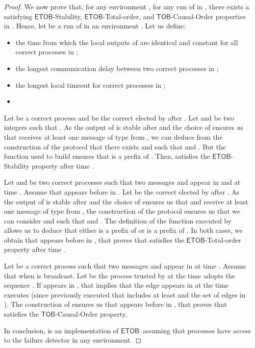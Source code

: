 \documentclass[11pt]{article}
\newcommand{\ETOB}{\ensuremath{\mathsf{ETOB}}}
\newcommand{\TOB}{\ensuremath{\mathsf{TOB}}}
\begin{document}
{\begin{proof}
We now prove that, for any environment , for any run  of  in , there exists a  satisfying \ETOB-Stability, \ETOB-Total-order, and \TOB-Causal-Order properties in . Hence, let  be a run of  in an environment . Let us define:
\begin{itemize}
\item  the time from which the local outputs of  are identical and constant for all correct processes in ;
\item  the longest communication delay between two correct processes in ;
\item  the longest local timeout for correct processes in ;
\item 
\end{itemize}

Let  be a correct process and  be the correct elected by  after . Let  and  be two integers such that . As the output of  is stable after  and the choice of  ensures us that  receives at least one message of type  from , we can deduce from the construction of the protocol that there exists  and  such that  and . But the function  used to build  ensures that  is a prefix of . Then,  satisfies the \ETOB-Stability property after time .

Let  and  be two correct processes such that two messages  and  appear in  and  at time . Assume that  appears before  in . Let  be the correct elected by  after . As the output of  is stable after  and the choice of  ensures us that  and  receive at least one message of type  from , the construction of the protocol ensures us that we can consider  and  such that  and . The definition of the function  executed by  allows us to deduce that either  is a prefix of  or  is a prefix of . In both cases, we obtain that  appears before  in , that proves that  satisfies the \ETOB-Total-order property after time .

Let  be a correct process such that two messages  and  appear in  at time . Assume that  when  is broadcast. Let  be the process trusted by  at the time  adopts the sequence . If  appears in , that implies that the edge  appears in  at the time  executes  (since  previously executed  that includes at least  and the set of edges  in ). The construction of  ensures us that  appears before  in , that proves that  satisfies the \TOB-Causal-Order property.

In conclusion,  is an implementation of \ETOB~assuming that processes have access to the  failure detector in any environment.
\end{proof}
}
\end{document}
